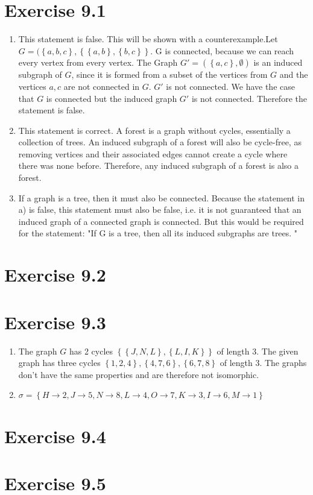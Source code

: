 \documentclass{article} %
\newcommand{\homeworkNumber}{9}
\begin{document}
\section*{Exercise \homeworkNumber.1}
\begin{enumerate}
	\item This statement is false. This will be shown with a counterexample.Let \( G =  (\left\{ a,b,c \right\},\left\{ \left\{ a,b \right\}, \left\{ b,c \right\}  \right\}    \). G is connected, because we can reach every vertex from every vertex. The Graph \( G' = (\left\{ a,c \right\}, \emptyset) \) is an induced subgraph of \( G \), since it is formed from a subset of the vertices from \( G \) and the vertices \( a,c \) are not connected in \( G \). \( G' \) is not connected. We have the case that \( G \) is connected but the induced graph \( G' \) is not connected. Therefore the statement is false.
	\item This statement is correct. A forest is a graph without cycles, essentially a collection of trees. An induced subgraph of a forest will also be cycle-free, as removing vertices and their associated edges cannot create a cycle where there was none before. Therefore, any induced subgraph of a forest is also a forest.
	\item If a graph is a tree, then it must also be connected. Because the statement in a) is false, this statement must also be false, i.e. it is not guaranteed that an induced graph of a connected graph is connected. But this would be required for the statement: "If G is a tree, then all its induced subgraphs are trees. "
\end{enumerate}

\section*{Exercise \homeworkNumber.2}


\section*{Exercise \homeworkNumber.3}
\begin{enumerate}
	\item The graph \( G \) has 2 cycles \( \left\{ \left\{ J , N, L \right\}, \left\{ L, I, K \right\} \right\} \) of length 3. The given graph has three cycles \( \left\{ 1,2,4 \right\}, \left\{ 4,7,6 \right\}, \left\{ 6,7,8 \right\}  \) of length 3. The graphs don't have the same properties and are therefore not isomorphic.

	\item \( \sigma = \left\{ H \to 2, J \to 5, N \to 8, L \to 4, O \to 7, K \to 3, I \to 6, M \to 1 \right\}  \)

\end{enumerate}


\section*{Exercise \homeworkNumber.4}

\section*{Exercise \homeworkNumber.5}
\end{document}
